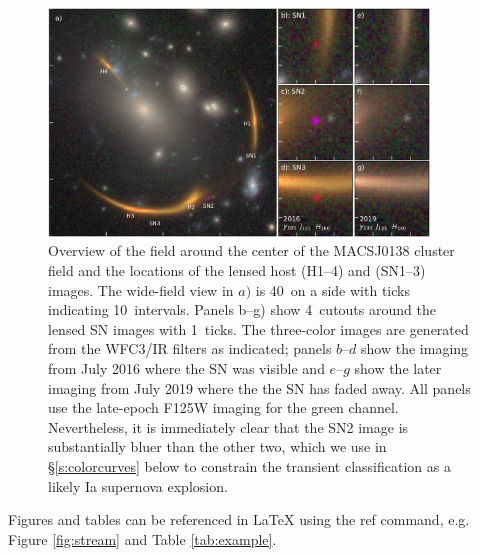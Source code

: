 \documentclass[fleqn,10pt]{wlscirep}
\begin{document}
\begin{figure}
    \centering
    \includegraphics[width=0.9\textwidth]{../Figures/fig1_layout.pdf}
    \caption{Overview of the field around the center of the MACSJ0138 cluster field and the locations of the lensed host (H1--4) and \SNABC (SN1--3) images. The wide-field view in $a)$ is 40\arcsec\ on a side with ticks indicating 10\arcsec\ intervals.  Panels b--g) show 4\arcsec\ cutouts around the lensed SN images with 1\arcsec\ ticks.  The three-color images are generated from the WFC3/IR filters as indicated; panels $b$--$d$ show the imaging from July 2016 where the SN was visible and $e$--$g$ show the later imaging from July 2019 where the the SN has faded away.  All panels use the late-epoch F125W imaging for the green channel.  Nevertheless, it is immediately clear that the SN2 image is substantially bluer than the other two, which we use in \S\ref{s:colorcurves} below to constrain the transient classification as a likely Ia supernova explosion.}
    
    \label{fig:layout}
\end{figure}



Figures and tables can be referenced in LaTeX using the ref command, e.g. Figure \ref{fig:stream} and Table \ref{tab:example}.
\end{document}
